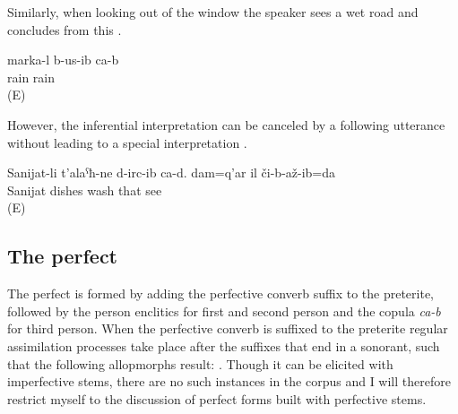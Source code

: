 Similarly, when looking out of the window the speaker sees a wet road and concludes from this .
%
\begin{exe}
	\ex	\label{ex:It has rained analytic}
	\gll	marka-l	b-us-ib	ca-b\\
		rain	rain	\\
	\glt	{} (E)
\end{exe}

However, the inferential interpretation can be canceled by a following utterance without leading to a special interpretation .
%
\begin{exe}
	\ex	\label{ex:Sanijat has washed the dishes. I saw it myself}
	\gll	Sanijat-li 	t'alaˁħ-ne	d-irc-ib ca-d.	dam=q'ar	il	či-b-až-ib=da\\
		Sanijat	dishes	wash 		that	see\\
	\glt	{} (E)
\end{exe}





\subsection{The perfect}
\label{ssec:The perfect}

The perfect is formed by adding the perfective converb suffix to the preterite, followed by the person enclitics for first and second person and the copula \textit{ca-b} for third person. When the perfective converb is suffixed to the preterite regular assimilation processes take place after the suffixes that end in a sonorant, such that the following allopmorphs result: . Though it can be elicited with imperfective stems, there are no such instances in the corpus and I will therefore restrict myself to the discussion of perfect forms built with perfective stems.


